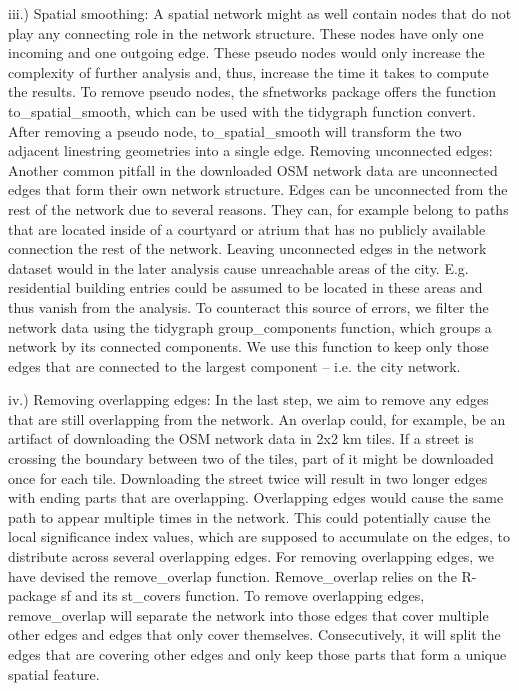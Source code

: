 \documentclass[10pt]{article}
\begin{document}
iii.) Spatial smoothing: A spatial network might as well contain nodes that do not play any connecting role in the network structure. These nodes have only one incoming and one outgoing edge. These pseudo nodes would only increase the complexity of further analysis and, thus, increase the time it takes to compute the results. To remove pseudo nodes, the sfnetworks package offers the function to\_spatial\_smooth, which can be used with the tidygraph function convert. After removing a pseudo node, to\_spatial\_smooth will transform the two adjacent linestring geometries into a single edge. 
Removing unconnected edges: Another common pitfall in the downloaded OSM network data are unconnected edges that form their own network structure. Edges can be unconnected from the rest of the network due to several reasons. They can, for example belong to paths that are located inside of a courtyard or atrium that has no publicly available connection the rest of the network. Leaving unconnected edges in the network dataset would in the later analysis cause unreachable areas of the city. E.g. residential building entries could be assumed to be located in these areas and thus vanish from the analysis. To counteract this source of errors, we filter the network data using the tidygraph group\_components function, which groups a network by its connected components. We use this function to keep only those edges that are connected to the largest component – i.e. the city network. 

iv.) Removing overlapping edges: In the last step, we aim to remove any edges that are still overlapping from the network. An overlap could, for example, be an artifact of downloading the OSM network data in 2x2 km tiles. If a street is crossing the boundary between two of the tiles, part of it might be downloaded once for each tile. Downloading the street twice will result in two longer edges with ending parts that are overlapping. Overlapping edges would cause the same path to appear multiple times in the network. This could potentially cause the local significance index values, which are supposed to accumulate on the edges, to distribute across several overlapping edges. For removing overlapping edges, we have devised the remove\_overlap function. Remove\_overlap relies on the R- package sf and its st\_covers function. To remove overlapping edges, remove\_overlap will separate the network into those edges that cover multiple other edges and edges that only cover themselves. Consecutively, it will split the edges that are covering other edges and only keep those parts that form a unique spatial feature.
\end{document}
